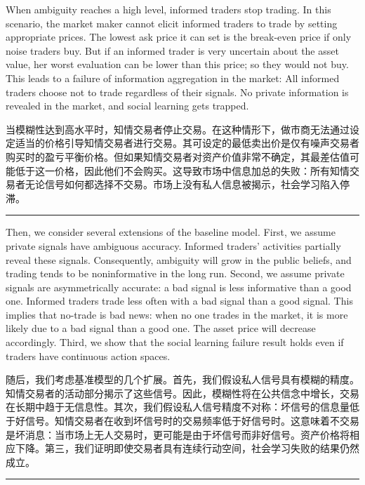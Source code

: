 \documentclass[12pt,a4paper]{article}
\newenvironment{original}{%
  \par\vspace{4pt}\noindent%
  \color{black}%
  \ignorespaces
}{%
  \par\vspace{2pt}%
}
\newenvironment{translation}{%
  \par\vspace{2pt}\noindent%
  \color{transblue}%
  \ignorespaces
}{%
  \par\vspace{4pt}\hrule\vspace{6pt}%
}
\begin{document}
\begin{original}
When ambiguity reaches a high level, informed traders stop trading. In this scenario, the market maker cannot elicit informed traders to trade by setting appropriate prices. The lowest ask price it can set is the break-even price if only noise traders buy. But if an informed trader is very uncertain about the asset value, her worst evaluation can be lower than this price; so they would not buy. This leads to a failure of information aggregation in the market: All informed traders choose not to trade regardless of their signals. No private information is revealed in the market, and social learning gets trapped.
\end{original}
\begin{translation}
当模糊性达到高水平时，知情交易者停止交易。在这种情形下，做市商无法通过设定适当的价格引导知情交易者进行交易。其可设定的最低卖出价是仅有噪声交易者购买时的盈亏平衡价格。但如果知情交易者对资产价值非常不确定，其最差估值可能低于这一价格，因此他们不会购买。这导致市场中信息加总的失败：所有知情交易者无论信号如何都选择不交易。市场上没有私人信息被揭示，社会学习陷入停滞。
\end{translation}

\begin{original}
Then, we consider several extensions of the baseline model. First, we assume private signals have ambiguous accuracy. Informed traders' activities partially reveal these signals. Consequently, ambiguity will grow in the public beliefs, and trading tends to be noninformative in the long run. Second, we assume private signals are asymmetrically accurate: a bad signal is less informative than a good one. Informed traders trade less often with a bad signal than a good signal. This implies that no-trade is bad news: when no one trades in the market, it is more likely due to a bad signal than a good one. The asset price will decrease accordingly. Third, we show that the social learning failure result holds even if traders have continuous action spaces.
\end{original}
\begin{translation}
随后，我们考虑基准模型的几个扩展。首先，我们假设私人信号具有模糊的精度。知情交易者的活动部分揭示了这些信号。因此，模糊性将在公共信念中增长，交易在长期中趋于无信息性。其次，我们假设私人信号精度不对称：坏信号的信息量低于好信号。知情交易者在收到坏信号时的交易频率低于好信号时。这意味着不交易是坏消息：当市场上无人交易时，更可能是由于坏信号而非好信号。资产价格将相应下降。第三，我们证明即使交易者具有连续行动空间，社会学习失败的结果仍然成立。
\end{translation}
\end{document}
